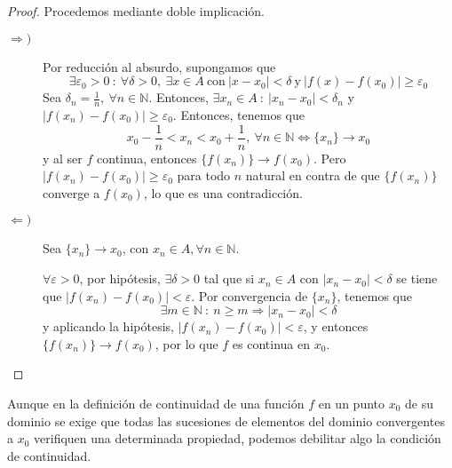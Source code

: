 \begin{proof} Procedemos mediante doble implicación.
\begin{description}
    \item[$\Longrightarrow)$]
        Por reducción al absurdo, supongamos que
        \begin{equation*}
            \exists \varepsilon_0 > 0 ~:~ \forall \delta > 0, ~ \exists x \in A ~ \text{con} ~ |x-x_0| < \delta ~ \text{y} ~ |f(x)-f(x_0)| \geq \varepsilon_0
        \end{equation*}
        Sea $\delta_n = \frac{1}{n}, ~ \forall n \in \mathbb{N}$. Entonces, $\exists x_n \in A ~:~ |x_n-x_0| < \delta_n$
        y $|f(x_n)-f(x_0)| \geq \varepsilon_0$. Entonces, tenemos que
        \begin{equation*}
            x_0 - \frac{1}{n} < x_n < x_0 + \frac{1}{n}, ~ \forall n \in \mathbb{N} \Longleftrightarrow \{x_n\} \longrightarrow x_0
        \end{equation*}
        y al ser $f$ continua, entonces $\{f(x_n)\} \longrightarrow f(x_0)$. Pero $|f(x_n)-f(x_0)| \geq \varepsilon_0$ para todo $n$
        natural en contra de que $\{f(x_n)\}$ converge a $f(x_0)$, lo que es una contradicción.
    \item[$\Longleftarrow)$]
        Sea $\{x_n\} \longrightarrow x_0$, con $x_n \in A, \forall n \in \mathbb{N}$.
        
        $\forall \varepsilon > 0$, por hipótesis, $\exists \delta > 0$ tal que si $x_n \in A$ con $|x_n - x_0| < \delta$
        se tiene que  $|f(x_n)-f(x_0)| < \varepsilon$. Por convergencia de $\{x_n\}$, tenemos que
        \begin{equation*}
            \exists m \in \mathbb{N} ~:~ n \geq m \Longrightarrow |x_n - x_0| < \delta
        \end{equation*}
        y aplicando la hipótesis, $|f(x_n)-f(x_0)| < \varepsilon$, y entonces $\{f(x_n)\} \longrightarrow f(x_0)$,
        por lo que $f$ es continua en $x_0$.
\end{description}
    
\end{proof}

Aunque en la definición de continuidad de una función $f$ en un punto $x_0$ de su dominio se exige que todas las sucesiones de elementos del dominio convergentes a $x_0$ verifiquen una determinada propiedad, podemos debilitar algo la condición de continuidad.

